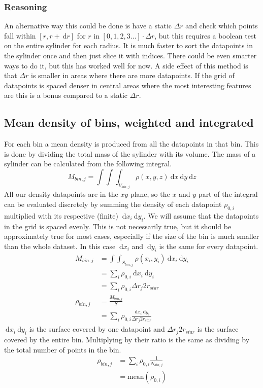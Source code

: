 \documentclass[a4paper, 12pt, english, titlepage]{article}
\newcommand{\D}[1]{\ \mathrm{d}#1} %
\begin{document}
    \subsubsection{Reasoning}
        An alternative way this could be done is have a static $\Delta r$ and check which points fall within $[r, r + \D r]$ for $r$ in $[0, 1, 2, 3 \hdots]\cdot\Delta r$, but this requires a boolean test on the entire sylinder for each radius. It is much faster to sort the datapoints in the sylinder once and then just slice it with indices. There could be even smarter ways to do it, but this has worked well for now. A side effect of this method is that $\Delta r$ is smaller in areas where there are more datapoints. If the grid of datapoints is spaced denser in central areas where the most interesting features are this is a bonus compared to a static $\Delta r$.


\subsection{Mean density of bins, weighted and integrated}
    For each bin a mean density is produced from all the datapoints in that bin. This is done by dividing the total mass of the sylinder with its volume. The mass of a sylinder can be calculated from the following integral.
    $$
    M_{bin,j} = \int\int\int_{V_{bin,j}} \rho(x,y,z) \D{x}\D{y}\D{z}
    $$
    All our density datapoints are in the $xy$-plane, so the $x$ and $y$ part of the integral can be evaluated discretely by summing the density of each datapoint $\rho_{0,i}$ multiplied with its respective (finite) $\D{x_i}\D{y_i}$. We will assume that the datapoints in the grid is spaced evenly. This is not necessarily true, but it should be approximately true for most cases, especially if the size of the bin is much smaller than the whole dataset. In this case $\D{x_i}$ and $\D{y_i}$ is the same for every datapoint.
    \begin{align*}
        M_{bin,j}
            &= \int\int_{S_{bin,j}} \rho(x_i,y_i) \D{x_i}\D{y_i} \\
            &= \sum_i \rho_{0,i} \D{x_i}\D{y_i} \\
            &= \sum_i \rho_{0,i} \Delta r_j 2 r_{star} \\
        \rho_{bin,j} &= \frac{M_{bin,j}}{S} \\
            &= \sum_i \rho_{0,i} \frac{\D{x_i}\D{y_i}}{\Delta r_j 2 r_{star}}
    \end{align*}
    $\D{x_i}\D{y_i}$ is the surface covered by one datapoint and $\Delta r_j 2 r_{star}$ is the surface covered by the entire bin. Multiplying by their ratio is the same as dividing by the total number of points in the bin.
    \begin{align*}
        \rho_{bin,j}
            &= \sum_i \rho_{0,i} \frac{1}{N_{bin,j}} \\
            &= \textrm{mean}(\rho_{0,i})
    \end{align*}
\end{document}
